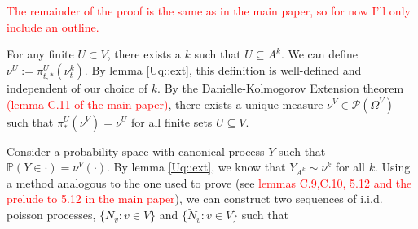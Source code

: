 \documentclass[12pt]{article}
\newcommand{\mb}{\mathbb}
\newcommand{\mc}{\mathcal}
\newcommand{\tr}{\textcolor{red}}
\newcommand{\ind}{\hspace{24pt}}
\newcommand{\pr}{\mb{P}}							%
\newcommand{\defeq}{:=}								%
\newcommand{\pmsr}{\mc{P}}							%
\newcommand{\indx}[1]{^{#1}}						%
\newcommand{\poiss}{N}								%
\newcommand{\proj}{\pi}								%
\newcommand{\poissv}[1]{_{#1}}						%
\newcommand{\vind}[1]{_{#1}}						%
\newcommand{\vpara}[1]{^{#1}}						%
\newcommand{\tpara}[1]{_{#1}}						%
\newcommand{\psf}{_*}								%
\newcommand{\tparapsf}[1]{_{#1,*}}					%
\newcommand{\Xg}{Y}									%
\newcommand{\alt}[1]{\tilde{#1}}					%
\newcommand{\mm}{\nu}								%
\begin{document}
\tr{The remainder of the proof is the same as in the main paper, so for now I'll only include an outline.}

For any finite \(U \subset V\), there exists a \(k\) such that \(U \subseteq A\indx{k}\). We can define \(\mm\vpara{U} \defeq \proj\tparapsf{t}\vpara{U}(\mm\indx{k}\tpara{t})\). By lemma \ref{Uq::ext}, this definition is well-defined and independent of our choice of \(k\). By the Danielle-Kolmogorov Extension theorem \tr{(lemma C.11 of the main paper)}, there exists a unique measure \(\mm\vpara{V} \in \pmsr(\Omega\vpara{V})\) such that \(\proj\psf\vpara{U}(\mm\vpara{V}) = \mm\vpara{U}\) for all finite sets \(U\subseteq V\).

\ind Consider a probability space with canonical process \(\Xg\) such that \(\pr(\Xg \in \cdot) = \mm\vpara{V}(\cdot)\). By lemma \ref{Uq::ext}, we know that \(\Xg\vind{A\indx{k}} \sim \mm\indx{k}\) for all \(k\). Using a method analogous to the one used to prove \cite[Proposition 14.7.1]{DalVer08} (see \tr{lemmas C.9,C.10, 5.12 and the prelude to 5.12 in the main paper}), we can construct two sequences of i.i.d. poisson processes, \(\{\poiss\poissv{v}:v \in V\}\) and \(\{\alt{\poiss}\poissv{v}:v \in V\}\) such that 
\end{document}
